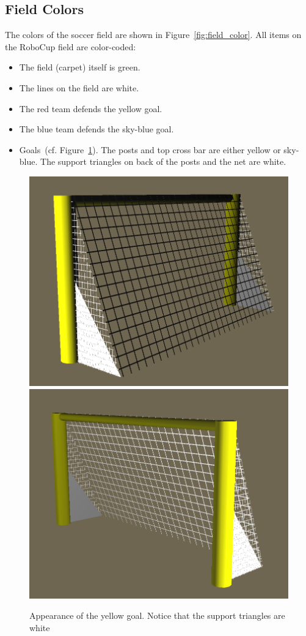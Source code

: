 \documentclass[12pt]{article}
\newcommand{\cf}{\mbox{cf.}\xspace}
\begin{document}
\subsection{Field Colors}

The colors of the soccer field are shown in
Figure~\ref{fig:field_color}. All items on the RoboCup field are
color-coded:

\begin{itemize}
\item The field (carpet) itself is green.
\item The lines on the field are white.
\item The red team defends the yellow goal.
\item The blue team defends the sky-blue goal.
\item Goals~(\cf Figure~\ref{fig:goal_colors}). The posts and top cross
  bar are either yellow or sky-blue. The support triangles on back of the posts and the net are white.
\end{itemize}

\begin{figure}[htp]
\begin{center}
    \leavevmode
    \includegraphics[width=0.45\columnwidth]{figs/GoalBack}
    \includegraphics[width=0.45\columnwidth]{figs/GoalFront}
    \caption{Appearance of the yellow goal. Notice that the support triangles are white}
    \label{fig:goal_colors}
\end{center}
\end{figure}
\end{document}
